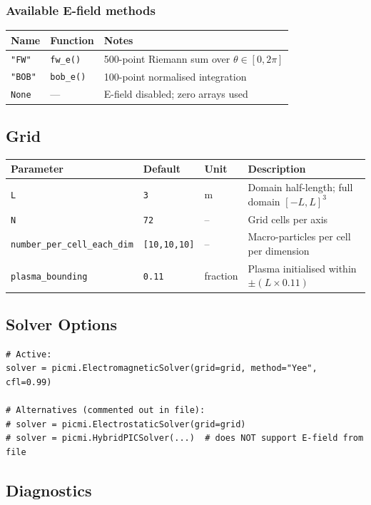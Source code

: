 \documentclass[11pt, a4paper]{article}
\begin{document}
\subsubsection*{Available E-field methods}
\begin{longtable}{L{2.5cm} L{3cm} L{7.5cm}}
\toprule
\textbf{Name} & \textbf{Function} & \textbf{Notes} \\
\midrule
\texttt{"FW"}  & \texttt{fw\_e()}  & 500-point Riemann sum over $\theta \in [0, 2\pi]$ \\
\texttt{"BOB"} & \texttt{bob\_e()} & 100-point normalised integration \\
\texttt{None}  & ---               & E-field disabled; zero arrays used \\
\bottomrule
\end{longtable}

\subsection{Grid}
\begin{longtable}{L{4.5cm} L{2.5cm} L{1.5cm} L{5cm}}
\toprule
\textbf{Parameter} & \textbf{Default} & \textbf{Unit} & \textbf{Description} \\
\midrule
\texttt{L} & \texttt{3} & m & Domain half-length; full domain $[-L, L]^3$ \\
\texttt{N} & \texttt{72} & -- & Grid cells per axis \\
\texttt{number\_per\_cell\_each\_dim} & \texttt{[10,10,10]} & -- & Macro-particles per cell per dimension \\
\texttt{plasma\_bounding} & \texttt{0.11} & fraction & Plasma initialised within $\pm(L \times 0.11)$ \\
\bottomrule
\end{longtable}

\subsection{Solver Options}
\begin{lstlisting}[style=python]
# Active:
solver = picmi.ElectromagneticSolver(grid=grid, method="Yee", cfl=0.99)

# Alternatives (commented out in file):
# solver = picmi.ElectrostaticSolver(grid=grid)
# solver = picmi.HybridPICSolver(...)  # does NOT support E-field from file
\end{lstlisting}

\subsection{Diagnostics}
\end{document}
